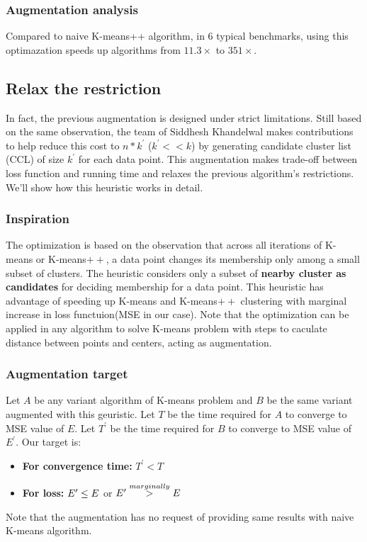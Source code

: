 \documentclass[11pt]{article}
\begin{document}
\subsubsection{Augmentation analysis}
Compared to naive K-means++ algorithm, in 6 typical benchmarks, using this optimazation speeds up algorithms from $ 11.3 \times$ to $  351 \times$.

\subsection{Relax the restriction}
In fact, the previous augmentation is designed under strict limitations. Still based on the same observation, the team of Siddhesh Khandelwal\cite{Faster} makes contributions to help reduce this cost to $n * k^{\prime}$ ($k^{\prime} << k$) by generating candidate cluster list (CCL) of size $k^{\prime}$ for each data point. This augmentation makes trade-off between loss function and running time and relaxes the previous algorithm's restrictions. We'll show how this heuristic works in detail.

\subsubsection{Inspiration}
The optimization is based on the observation that across all iterations of K-means or K-means$++$, a data point changes its membership only among a small subset of clusters. The heuristic considers only a subset of \textbf{nearby cluster as candidates} for deciding membership for a data point. This heuristic has advantage of speeding up K-means and K-means$++$ clustering with marginal increase in loss functuion(MSE in our case). Note that the optimization can be applied in any algorithm to solve K-means problem with steps to caculate distance between points and centers, acting as augmentation.
\subsubsection{Augmentation target}
Let $A$ be any variant algorithm of K-means problem and $B$ be the same variant augmented with this geuristic. Let $T$ be the time required for $A$ to converge to MSE value of $E$. Let $T^{\prime}$ be the time required for $B$ to converge to MSE value of $E^{\prime}$. Our target is:
\begin{itemize}
\item \textbf{For convergence time:} $T^{\prime} < T$
\item \textbf{For loss:} $E^{\prime} \le E \space $ or $ \space E^{\prime} \overset{marginally}{>} E$
\end{itemize}
Note that the augmentation has no request of providing same results with naive K-means algorithm.
\end{document}
